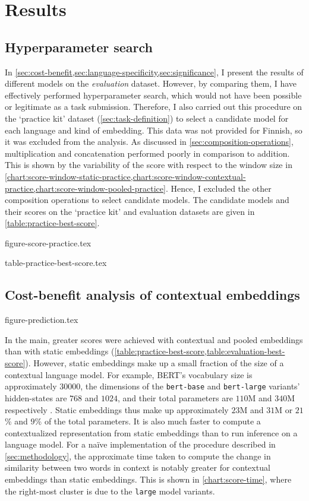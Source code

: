 \section{Results}
\label{sec:results}

\subsection{Hyperparameter search}
\label{sec:hyperparameter-search}

In \cref{sec:cost-benefit,sec:language-specificity,sec:significance}, I present the
results of different models on the \emph{evaluation} dataset.
However, by comparing them, I have effectively performed hyperparameter search, which
would not have been possible or legitimate as a task submission.
Therefore, I also carried out this procedure on the `practice kit' dataset
(\cref{sec:task-definition}) to select a candidate model for each language and kind of
embedding.
This data was not provided for Finnish, so it was excluded from the analysis.
As discussed in \cref{sec:composition-operations}, multiplication and concatenation
performed poorly in comparison to addition.
This is shown by the variability of the score with respect to the window size in
\cref{chart:score-window-static-practice,chart:score-window-contextual-practice,chart:score-window-pooled-practice}.
Hence, I excluded the other composition operations to select candidate models.
The candidate models and their scores on the `practice kit' and evaluation datasets are
given in \cref{table:practice-best-score}.

{figure-score-practice.tex}

{table-practice-best-score.tex}

\subsection{Cost-benefit analysis of contextual embeddings}
\label{sec:cost-benefit}

{figure-prediction.tex}

In the main, greater scores were achieved with contextual and pooled embeddings than
with static embeddings (\cref{table:practice-best-score,table:evaluation-best-score}).
However, static embeddings make up a small fraction of the size of a contextual
language model.
For example, BERT's vocabulary size is approximately $30000$, the dimensions of the
\texttt{bert-base} and \texttt{bert-large} variants' hidden-states are $768$ and
$1024$, and their total parameters are $110$M and $340$M respectively
\parencite[4173-4174]{Devlin2019}.
Static embeddings thus make up approximately $23$M and $31$M or $21$\% and $9$\% of the
total parameters.
It is also much faster to compute a contextualized representation from static
embeddings than to run inference on a language model.
For a naïve implementation of the procedure described in \cref{sec:methodology}, the
approximate time taken to compute the change in similarity between two words in context
is notably greater for contextual embeddings than static embeddings.
This is shown in \cref{chart:score-time}, where the right-most cluster is due to the
\texttt{large} model variants.

